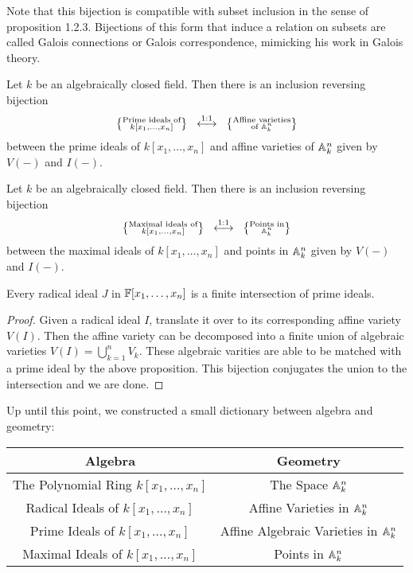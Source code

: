 \documentclass[a4paper]{article}
\begin{document}
Note that this bijection is compatible with subset inclusion in the sense of proposition 1.2.3. Bijections of this form that induce a relation on subsets are called Galois connections or Galois correspondence, mimicking his work in Galois theory. 

\begin{crl}{}{} Let $k$ be an algebraically closed field. Then there is an inclusion reversing bijection $$\left\{\substack{\text{Prime ideals of}\\ k[x_1,\dots,x_n]}\right\}\;\;\overset{\text{1:1}}{\longleftrightarrow}\;\;\left\{\substack{\text{Affine varieties}\\\text{of }\mathbb{A}_k^n}\right\}$$ between the prime ideals of $k[x_1,\dots,x_n]$ and affine varieties of $\mathbb{A}_k^n$ given by $V(-)$ and $I(-)$. 
\end{crl}

\begin{crl}{}{} Let $k$ be an algebraically closed field. Then there is an inclusion reversing bijection $$\left\{\substack{\text{Maximal ideals of}\\ k[x_1,\dots,x_n]}\right\}\;\;\overset{\text{1:1}}{\longleftrightarrow}\;\;\left\{\substack{\text{Points in}\\\mathbb{A}_k^n}\right\}$$ between the maximal ideals of $k[x_1,\dots,x_n]$ and points in $\mathbb{A}_k^n$ given by $V(-)$ and $I(-)$. 
\end{crl}

\begin{prp}{}{} Every radical ideal $J$ in $\mathbb{F}[x_1,\dots,x_n]$ is a finite intersection of prime ideals. \tcbline
\begin{proof}
Given a radical ideal $I$, translate it over to its corresponding affine variety $V(I)$. Then the affine variety can be decomposed into a finite union of algebraic varieties $V(I)=\bigcup_{k=1}^nV_k$. These algebraic varities are able to be matched with a prime ideal by the above proposition. This bijection conjugates the union to the intersection and we are done. 
\end{proof}
\end{prp}

Up until this point, we constructed a small dictionary between algebra and geometry: \\
\begin{center}\begin{tabular}{c|c}
Algebra & Geometry\\
\hline
The Polynomial Ring $k[x_1,\dots,x_n]$ & The Space $\mathbb{A}_k^n$\\
Radical Ideals of $k[x_1,\dots,x_n]$ & Affine Varieties in $\mathbb{A}_k^n$\\
Prime Ideals of $k[x_1,\dots,x_n]$ & Affine Algebraic Varieties in $\mathbb{A}_k^n$\\
Maximal Ideals of $k[x_1,\dots,x_n]$ & Points in $\mathbb{A}_k^n$
\end{tabular}\end{center}
\end{document}
